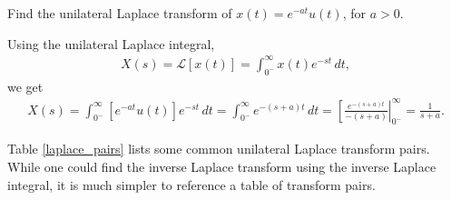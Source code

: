 \documentclass{report}
\begin{document}
\begin{example}
    Find the unilateral Laplace transform of $x(t)=e^{-at}u(t)$, for $a>0$. 
\end{example}
\begin{solution}
    Using the unilateral Laplace integral, 
    \begin{align*}
        X(s) = \mathcal{L}[x(t)] = \int_{0^-}^{\infty} x(t) e^{-st} \,dt, 
    \end{align*}
    we get
    \begin{align*}
        X(s) = \int_{0^-}^{\infty} [e^{-at}u(t)]e^{-st} \,dt = \int_{0^-}^{\infty} e^{-(s+a)t} \,dt = \left[\frac{e^{-(s+a)t}}{-(s+a)}\right|_{0^-}^{\infty} = \frac{1}{s+a}.
    \end{align*}
\end{solution}

Table \ref{laplace_pairs} lists some common unilateral Laplace transform pairs. While one could find the inverse Laplace transform using the inverse Laplace integral, 
it is much simpler to reference a table of transform pairs. 
\end{document}
